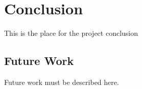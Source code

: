 \section{Conclusion}
\label{sec:conclusion}
This is the place for the project conclusion


\subsection{Future Work}
Future work must be described here.


